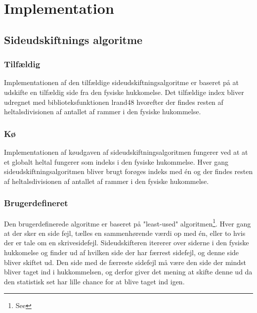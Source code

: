 \section{Implementation}
\subsection{Sideudskiftnings algoritme}
\subsubsection{Tilfældig}
Implementationen af den tilfældige sideudskiftningsalgoritme er baseret på at udskifte en tilfældig side fra den fysiske hukkomelse. Det tilfældige index bliver udregnet med biblioteksfunktionen lrand48 hvorefter der findes resten af heltalsdivisionen af antallet af rammer i den fysiske hukommelse.

\subsubsection{Kø}
Implementationen af køudgaven af sideudskiftningsalgoritmen fungerer ved at at et globalt heltal fungerer som indeks i den fysiske hukommelse. Hver gang sideudskiftningsalgoritmen bliver brugt forøges indeks med én og der findes resten af heltalsdivisionen af antallet af rammer i den fysiske hukommelse.

\subsubsection{Brugerdefineret}
Den brugerdefinerede algoritme er baseret på "least-used" algoritmen\footnote{See }. Hver gang at der sker en side fejl, tælles en sammenhørende værdi op med én, eller to hvis der er tale om en skrivesidefejl. Sideudskifteren itererer over siderne i den fysiske hukkomelse og finder ud af hvilken side der har færrest sidefejl, og denne side bliver skiftet ud. Den side med de færreste sidefejl må være den side der mindst bliver taget ind i hukkommelsen, og derfor giver det mening at skifte denne ud da den statistisk set har lille chance for at blive taget ind igen.